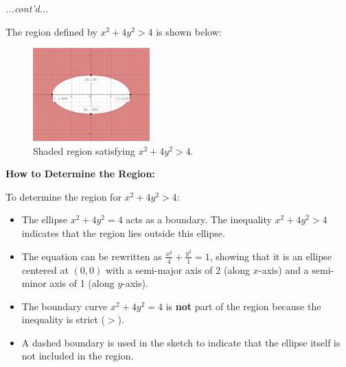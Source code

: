 \documentclass{article}
\begin{document}
\begin{examplebox}
\textit{...cont'd...}
\begin{solutionbox}
    The region defined by \( x^2 + 4y^2 > 4 \) is shown below:

    \begin{blankbox}
        \begin{figure}[H]
            \centering
            \includegraphics[width=0.4\textwidth]{x^2 + 4y^2 gt 4 region.png}
            \caption{Shaded region satisfying \( x^2 + 4y^2 > 4 \).}
            \label{fig:ellipse_region}
        \end{figure}
    \end{blankbox}

    \textbf{How to Determine the Region:}
    \begin{conceptbox}
    To determine the region for \( x^2 + 4y^2 > 4 \):
    \begin{itemize}
        \item The ellipse \( x^2 + 4y^2 = 4 \) acts as a boundary. The inequality \( x^2 + 4y^2 > 4 \) indicates that the region lies outside this ellipse.
        \item The equation can be rewritten as \( \frac{x^2}{4} + \frac{y^2}{1} = 1 \), showing that it is an ellipse centered at \( (0,0) \) with a semi-major axis of 2 (along \( x \)-axis) and a semi-minor axis of 1 (along \( y \)-axis).
        \item The boundary curve \( x^2 + 4y^2 = 4 \) is \textbf{not} part of the region because the inequality is strict (\( > \)).
        \item A dashed boundary is used in the sketch to indicate that the ellipse itself is not included in the region.
    \end{itemize}
    \end{conceptbox}
\end{solutionbox}    
\end{examplebox}
\end{document}
